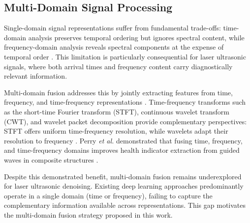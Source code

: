 \subsection{Multi-Domain Signal Processing}
\label{sec:multi-domain}

Single-domain signal representations suffer from fundamental trade-offs: time-domain analysis preserves temporal ordering but ignores spectral content, while frequency-domain analysis reveals spectral components at the expense of temporal order \cite{yang2023unsupervised}. This limitation is particularly consequential for laser ultrasonic signals, where both arrival times and frequency content carry diagnostically relevant information.

Multi-domain fusion addresses this by jointly extracting features from time, frequency, and time-frequency representations \cite{perry2026health}. Time-frequency transforms such as the short-time Fourier transform (STFT), continuous wavelet transform (CWT), and wavelet packet decomposition provide complementary perspectives: STFT offers uniform time-frequency resolution, while wavelets adapt their resolution to frequency \cite{chen2019wavelet}. Perry \textit{et al.} demonstrated that fusing time, frequency, and time-frequency domains improves health indicator extraction from guided waves in composite structures \cite{perry2026health}.

Despite this demonstrated benefit, multi-domain fusion remains underexplored for laser ultrasonic denoising. Existing deep learning approaches predominantly operate in a single domain (time or frequency), failing to capture the complementary information available across representations. This gap motivates the multi-domain fusion strategy proposed in this work.